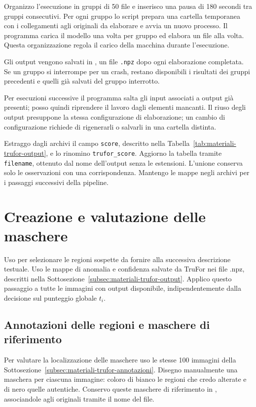 Organizzo l'esecuzione in gruppi di 50 file e inserisco una pausa di 180 secondi tra gruppi consecutivi. Per ogni gruppo lo script prepara una cartella temporanea con i collegamenti agli originali da elaborare e avvia un nuovo processo. Il programma carica il modello una volta per gruppo ed elabora un file alla volta. Questa organizzazione regola il carico della macchina durante l'esecuzione.

Gli output vengono salvati in , un file \texttt{.npz} dopo ogni elaborazione completata. Se un gruppo si interrompe per un crash, restano disponibili i risultati dei gruppi precedenti e quelli già salvati del gruppo interrotto.

Per esecuzioni successive il programma salta gli input associati a output già presenti; posso quindi riprendere il lavoro dagli elementi mancanti. Il riuso degli output presuppone la stessa configurazione di elaborazione; un cambio di configurazione richiede di rigenerarli o salvarli in una cartella distinta.

Estraggo dagli archivi il campo \texttt{score}, descritto nella Tabella~\ref{tab:materiali-trufor-output}, e lo rinomino \texttt{trufor\_score}. Aggiorno la tabella  tramite \texttt{filename}, ottenuto dal nome dell'output senza le estensioni. L'unione conserva solo le osservazioni con una corrispondenza. Mantengo le mappe negli archivi per i passaggi successivi della pipeline.

\section{Creazione e valutazione delle maschere}
\label{sec:metodi-maschere}

Uso  per selezionare le regioni sospette da fornire alla successiva descrizione testuale. Uso le mappe di anomalia e confidenza salvate da TruFor nei file .npz, descritti nella Sottosezione~\ref{subsec:materiali-trufor-output}. Applico questo passaggio a tutte le immagini con output disponibile, indipendentemente dalla decisione sul punteggio globale $t_i$.

\subsection{Annotazioni delle regioni e maschere di riferimento}
\label{subsec:materiali-maschere-riferimento}

Per valutare la localizzazione delle maschere uso le stesse 100 immagini della Sottosezione~\ref{subsec:materiali-trufor-annotazioni}. Disegno manualmente una maschera per ciascuna immagine: coloro di bianco le regioni che credo alterate e di nero quelle autentiche. Conservo queste maschere di riferimento in , associandole agli originali tramite il nome del file.

